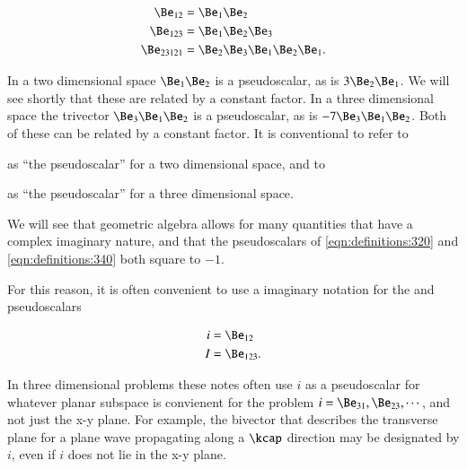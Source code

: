 \begin{equation}\label{eqn:multivector:360}
\begin{aligned}
\Be_{12} &= \Be_1 \Be_2 \\
\Be_{123} &= \Be_1 \Be_2 \Be_3 \\
\Be_{23121} &= \Be_2 \Be_3 \Be_1 \Be_2 \Be_1.
\end{aligned}
\end{equation}


In a two dimensional space \( \Be_1 \Be_2 \) is a pseudoscalar, as is \( 3 \Be_2 \Be_1 \).
We will see shortly that these are related by a constant factor.
In a three dimensional space the trivector
\( \Be_3 \Be_1 \Be_2 \) is a pseudoscalar, as is \( - 7 \Be_3 \Be_1 \Be_2 \).
Both of these can be related by a constant factor.
It is conventional to refer to


as ``the pseudoscalar'' for a two dimensional space, and to


as ``the pseudoscalar'' for a three dimensional space.

We will see that geometric algebra allows for many quantities that have a complex imaginary nature, and that the pseudoscalars of \cref{eqn:definitions:320} and \cref{eqn:definitions:340} both square to \(-1\).

For this reason, it is often convenient to use a imaginary notation for the  and  pseudoscalars

\begin{dmath}\label{eqn:multivector_nomenclature:42}
\begin{aligned}
i &= \Be_{12} \\
I &= \Be_{123}.
\end{aligned}
\end{dmath}

In three dimensional problems these notes often use \( i \) as a pseudoscalar for whatever planar subspace is convienent for the problem \( i = \Be_{31}, \Be_{23}, \cdots \), and not just the x-y plane.  For example, the bivector that describes the transverse plane for a plane wave propagating along a \( \kcap \) direction may be designated by \( i \), even if \( i \) does not lie in the x-y plane.
